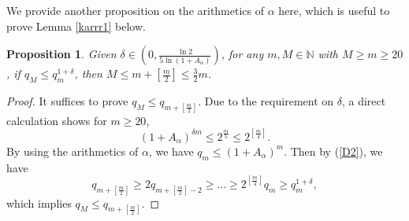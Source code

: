 \documentclass{amsart}
\newtheorem{Proposition}[Definition]{Proposition}
\theoremstyle{definition}
\begin{document}
We provide another proposition on the arithmetics of $\alpha$ here, which is useful to prove Lemma \ref{karrr1} below.
\begin{Proposition}\label{arthh}
Given $\delta\in (0,\frac{\ln 2}{5\ln(1+A_\alpha)})$, for any $m,M\in \mathbb{N}$ with $M\geq m\geq 20$, if $q_M\leq q_m^{1+\delta}$, then $M\leq m+[\frac{m}{2}]\leq \frac{3}{2}m$.
\end{Proposition}
\begin{proof}
It suffices to prove $q_M\leq q_{m+[\frac{m}{2}]}$.  Due to the requirement on $\delta$, a direct calculation shows for $m\geq 20$,
\[(1+A_\alpha)^{\delta m}\leq 2^{\frac{m}{5}}\leq 2^{[\frac{m}{4}]}.\]
By using the arithmetics of $\alpha$, we have $q_m\leq (1+A_\alpha)^m$. Then by (\ref{D2}), we have
\[q_{m+[\frac{m}{2}]}\geq 2q_{m+[\frac{m}{2}]-2}\geq \ldots \geq 2^{[\frac{m}{4}]}q_m\geq q_m^{1+\delta},\]
which implies $q_M\leq q_{m+[\frac{m}{2}]}$.
\end{proof}
\end{document}
